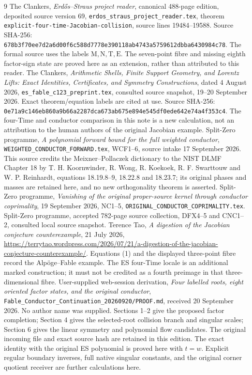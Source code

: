 \begin{thebibliography}{9}
 The Clankers, \emph{Erd\H{o}s--Straus project reader},
canonical 488-page edition, deposited source version 69,
\texttt{erdos\_straus\_project\_reader.tex}, theorem
\texttt{explicit-four-time-Jacobian-collision}, source lines
19484--19588. Source SHA-256:
\texttt{678b3f70ee7d2a6d00f6c588d7778e390118ab4743a5759612dbba6430984c78}.
The formal source uses the labels $\mathrm M,\mathrm N,\mathrm T,\mathrm E$.
The seven-point fibre and missing eighth factor-sign state are proved
here as an extension, rather than attributed to this reader.
 The Clankers, \emph{Arithmetic Shells, Finite Support Geometry,
and Lorentz Lifts: Exact Identities, Certificates, and Symmetry Constructions},
dated 4 August 2026, \texttt{es\_fable\_c123\_preprint.tex},
consulted source snapshot, 19--20 September 2026. Exact theorem/equation
labels are cited at use. Source SHA-256:
\texttt{0e71a9c146eb860a9b66a2287dca673ab675e894e545df0ede642e74a4f353c4}.
The four-Time and conductor comparison in
this note is a new calculation, not an attribution to the human authors
of the original Jacobian example.
 Split-Zero programme, \emph{A polynomial forward bound for
the full weighted conductor}, \texttt{WEIGHTED\_CONDUCTOR\_FORWARD.tex},
WCF1--6, source intake 17 September 2026. This source credits the
Meixner--Pollaczek dictionary to the NIST DLMF Chapter 18 by T. H. Koornwinder, R. Wong, R. Koekoek, R. F. Swarttouw and W. P. Reinhardt, equations
18.19.8--9, 18.22.8 and 18.23.7; its original phases and masses are
retained here, and no new orthogonality theorem is asserted.
 Split-Zero programme, \emph{Vanishing of the original
proper-source kernel through conductor coprimality}, 19 September 2026,
NC1--5, \texttt{ORIGINAL\_CONDUCTOR\_COPRIMALITY.tex}.
 Split-Zero programme, accepted 782-page source
collection, DFX4--5 and CNC1--2, consulted local source snapshot.
 Terence Tao, \emph{A digestion of the Jacobian conjecture
counterexample}, 21 July 2026,
\url{https://terrytao.wordpress.com/2026/07/21/a-digestion-of-the-jacobian-conjecture-counterexample/}.
Equations (1) and the displayed three-point fibre record the
Alp\"oge--Fable example. The ES four-Time locale is an additional marked
construction; it must not be credited as a fourth preimage in that
three-dimensional fibre.
 User-supplied web-session derivation, \emph{Four labelled roots, eight oriented factor states, and the original conductor}, \texttt{Fable\_Conductor\_Continuation\_20260920/PROOF.md}, received 20 September 2026. No author name was supplied. Sections 1--2 give the proposed factor completion; Section 4 gives the selected-root collision branch and singular scales; Section 6 gives the linear symmetry and polynomial flow candidates. The original incoming file and exact source hash are retained in this edition. The exact identity with the original ES polynomial is proved here with $t=w$. Explicit regular boundary inverses, full native singular constants, and the original corner quotient receiver are further calculations here.
\end{thebibliography}

\endgroup
